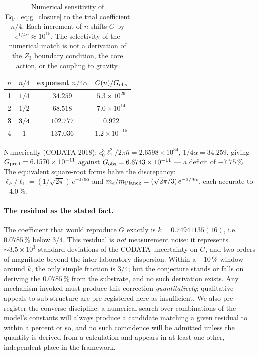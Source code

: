 \documentclass[11pt,a4paper]{article}
\theoremstyle{plain}
\theoremstyle{remark}
\begin{document}
\begin{table}[h]
\centering
\caption{Numerical sensitivity of Eq.~\eqref{eq:g_closure} to the trial coefficient $n/4$. Each increment of $n$ shifts $G$ by $e^{1/4\alpha} \approx 10^{15}$. The selectivity of the numerical match is not a derivation of the $Z_3$ boundary condition, the core action, or the coupling to gravity.}
\begin{tabular}{cccc}
\toprule
$n$ & $n/4$ & exponent $n/4\alpha$ & $G(n)/G_{\rm obs}$ \\
\midrule
1 & $1/4$ & $34.259$ & $5.3\times10^{29}$ \\
2 & $1/2$ & $68.518$ & $7.0\times10^{14}$ \\
\textbf{3} & $\mathbf{3/4}$ & $\mathbf{102.777}$ & $\mathbf{0.922}$ \\
4 & $1$ & $137.036$ & $1.2\times10^{-15}$ \\
\bottomrule
\end{tabular}
\label{tab:g_sensitivity}
\end{table}

Numerically (CODATA 2018): $c_0^3\ell_1^2/2\pi\hbar = 2.6598\times10^{34}$, $1/4\alpha = 34.259$, giving $G_{\rm pred} = 6.1570\times10^{-11}$ against $G_{\rm obs} = 6.6743\times10^{-11}$ --- a deficit of $-7.75\,\%$. The equivalent square-root forms halve the discrepancy: $\ell_P/\ell_1 = (1/\sqrt{2\pi})\,e^{-3/8\alpha}$ and $m_e/m_{\rm Planck} = (\sqrt{2\pi}/3)\,e^{-3/8\alpha}$, each accurate to $-4.0\,\%$.

\paragraph{The residual as the stated fact.} The coefficient that would reproduce $G$ exactly is $k = 0.74941135(16)$, i.e.\ $0.0785\,\%$ below $3/4$. This residual is \emph{not} measurement noise: it represents $\sim 3.5\times10^{3}$ standard deviations of the CODATA uncertainty on $G$, and two orders of magnitude beyond the inter-laboratory dispersion. Within a $\pm10\,\%$ window around $k$, the only simple fraction is $3/4$; but the conjecture stands or falls on deriving the $0.0785\,\%$ from the substrate, and no such derivation exists. Any mechanism invoked must produce this correction \emph{quantitatively}; qualitative appeals to sub-structure are pre-registered here as insufficient. We also pre-register the converse discipline: a numerical search over combinations of the model's constants will always produce a candidate matching a given residual to within a percent or so, and no such coincidence will be admitted unless the quantity is derived from a calculation and appears in at least one other, independent place in the framework.
\end{document}
